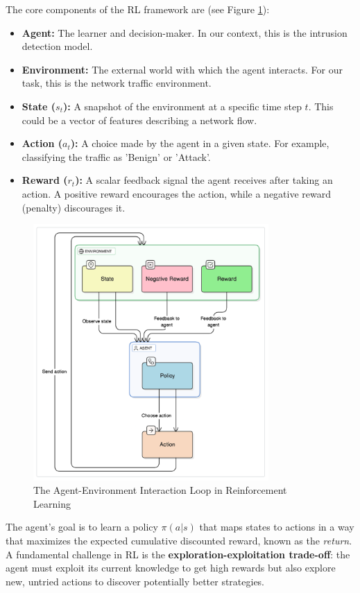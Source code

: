 \documentclass[16pt]{report}
\begin{document}
The core components of the RL framework are (see Figure \ref{fig:rl-diagram}):
\begin{itemize}
    \item \textbf{Agent:} The learner and decision-maker. In our context, this is the intrusion detection model.
    \item \textbf{Environment:} The external world with which the agent interacts. For our task, this is the network traffic environment.
    \item \textbf{State ($s_t$):} A snapshot of the environment at a specific time step $t$. This could be a vector of features describing a network flow.
    \item \textbf{Action ($a_t$):} A choice made by the agent in a given state. For example, classifying the traffic as 'Benign' or 'Attack'.
    \item \textbf{Reward ($r_t$):} A scalar feedback signal the agent receives after taking an action. A positive reward encourages the action, while a negative reward (penalty) discourages it.
\end{itemize}

\begin{figure}[H]
    \centering
    \includegraphics[width=0.8\textwidth]{images/rl-diagram.png}
    \caption{The Agent-Environment Interaction Loop in Reinforcement Learning}
    \label{fig:rl-diagram}
\end{figure}

The agent's goal is to learn a policy $\pi(a|s)$ that maps states to actions in a way that maximizes the expected cumulative discounted reward, known as the \textit{return}. A fundamental challenge in RL is the \textbf{exploration-exploitation trade-off}: the agent must exploit its current knowledge to get high rewards but also explore new, untried actions to discover potentially better strategies.
\end{document}
